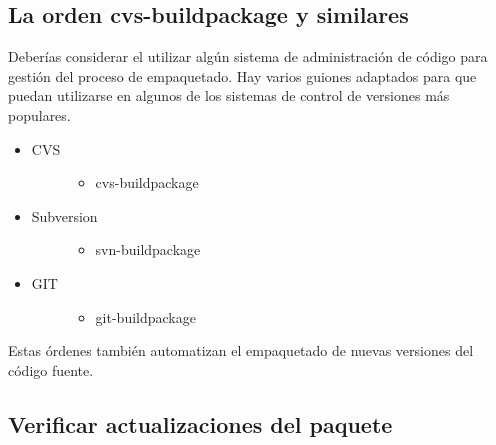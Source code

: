 \documentclass[letterpaper,12pt,spanish]{manual}
\begin{document}
\subsection{La orden cvs-buildpackage y similares}

Deberías considerar el utilizar algún sistema de administración de código para gestión del proceso de empaquetado. Hay varios guiones adaptados para que puedan utilizarse en algunos de los sistemas de control de versiones más populares.
\begin{itemize}
\item {} \begin{description}
\item[{CVS}] \leavevmode\begin{itemize}
\item {} 
cvs-buildpackage

\end{itemize}

\end{description}

\item {} \begin{description}
\item[{Subversion}] \leavevmode\begin{itemize}
\item {} 
svn-buildpackage

\end{itemize}

\end{description}

\item {} \begin{description}
\item[{GIT}] \leavevmode\begin{itemize}
\item {} 
git-buildpackage

\end{itemize}

\end{description}

\end{itemize}

Estas órdenes también automatizan el empaquetado de nuevas versiones del código fuente.


\subsection{Verificar actualizaciones del paquete}
\end{document}

